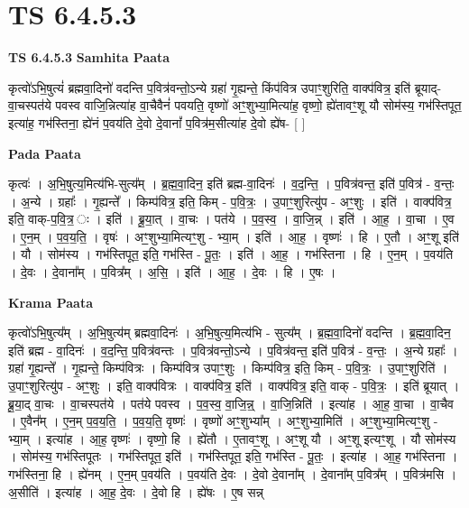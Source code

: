 \documentclass[17pt]{extarticle}
\begin{document}
\section{ TS 6.4.5.3 }

\textbf{TS 6.4.5.3 } \newline
\textbf{Samhita Paata} \newline

कृत्वो॑ऽभि॒षुत्यं॑ ब्रह्मवा॒दिनो॑ वदन्ति प॒वित्र॑वन्तो॒ऽन्ये ग्रहा॑ गृ॒ह्यन्ते॒ किंप॑वित्र उपाꣳ॒॒शुरिति॒ वाक्प॑वित्र॒ इति॑ ब्रूयाद्-वा॒चस्पत॑ये पवस्व वाजि॒न्नित्या॑ह वा॒चैवैनं॑ पवयति॒ वृष्णो॑ अꣳ॒॒शुभ्या॒मित्या॑ह॒ वृष्णो॒ ह्ये॑तावꣳ॒॒शू यौ सोम॑स्य॒ गभ॑स्तिपूत॒ इत्या॑ह॒ गभ॑स्तिना॒ ह्ये॑नं प॒वय॑ति दे॒वो दे॒वानां᳚ प॒वित्र॑म॒सीत्या॑ह दे॒वो ह्ये॑ष- [  ] \newline

\textbf{Pada Paata} \newline

कृत्वः॑ । अ॒भि॒षुत्य॒मित्य॑भि-सुत्य᳚म् । ब्र॒ह्म॒वा॒दिन॒ इति॑ ब्रह्म-वा॒दिनः॑ । व॒द॒न्ति॒ । प॒वित्र॑वन्त॒ इति॑ प॒वित्र॑ - व॒न्तः॒ । अ॒न्ये । ग्रहाः᳚ । गृ॒ह्यन्ते᳚ । किम्प॑वित्र॒ इति॒ किम् - प॒वि॒त्रः॒ । उ॒पाꣳ॒॒शुरित्यु॑प - अꣳ॒॒शुः । इति॑ । वाक्प॑वित्र॒ इति॒ वाक्-प॒वि॒त्र॒ ः । इति॑ । ब्रू॒या॒त् । वा॒चः । पत॑ये । प॒व॒स्व॒ । वा॒जि॒न्न् । इति॑ । आ॒ह॒ । वा॒चा । ए॒व । ए॒न॒म् । प॒व॒य॒ति॒ । वृषः॑ । अꣳ॒॒शुभ्या॒मित्यꣳ॒॒शु - भ्या॒म् । इति॑ । आ॒ह॒ । वृष्णः॑ । हि । ए॒तौ । अꣳ॒॒शू इति॑ । यौ । सोम॑स्य । गभ॑स्तिपूत॒ इति॒ गभ॑स्ति - पू॒तः॒ । इति॑ । आ॒ह॒ । गभ॑स्तिना । हि । ए॒न॒म् । प॒वय॑ति । दे॒वः । दे॒वाना᳚म् । प॒वित्र᳚म् । अ॒सि॒ । इति॑ । आ॒ह॒ । दे॒वः । हि । ए॒षः ।  \newline


\textbf{Krama Paata} \newline

कृत्वो॑ऽभि॒षुत्य᳚म् । अ॒भि॒षुत्य॑म् ब्रह्मवा॒दिनः॑ । अ॒भि॒षुत्य॒मित्य॑भि - सुत्य᳚म् । ब्र॒ह्म॒वा॒दिनो॑ वदन्ति । ब्र॒ह्म॒वा॒दिन॒ इति॑ ब्रह्म - वा॒दिनः॑ । व॒द॒न्ति॒ प॒वित्र॑वन्तः । प॒वित्र॑वन्तो॒ऽन्ये । प॒वित्र॑वन्त॒ इति॑ प॒वित्र॑ - व॒न्तः॒ । अ॒न्ये ग्रहाः᳚ । ग्रहा॑ गृ॒ह्यन्ते᳚ । गृ॒ह्यन्ते॒ किम्प॑वित्रः । किम्प॑वित्र उपाꣳ॒॒शुः । किम्प॑वित्र॒ इति॒ किम् - प॒वि॒त्रः॒ । उ॒पाꣳ॒॒शुरिति॑ । उ॒पाꣳ॒॒शुरित्यु॑प - अꣳ॒॒शुः । इति॒ वाक्प॑वित्रः । वाक्प॑वित्र॒ इति॑ । वाक्प॑वित्र॒ इति॒ वाक् - प॒वि॒त्रः॒ । इति॑ ब्रूयात् । ब्रू॒या॒द् वा॒चः । वा॒चस्पत॑ये । पत॑ये पवस्व । प॒व॒स्व॒ वा॒जि॒न्न्॒ । वा॒जि॒न्निति॑ । इत्या॑ह । आ॒ह॒ वा॒चा । वा॒चैव । ए॒वैन᳚म् । ए॒न॒म् प॒व॒य॒ति॒ । प॒व॒य॒ति॒ वृष्णः॑ । वृष्णो॑ अꣳ॒॒शुभ्या᳚म् । अꣳ॒॒शुभ्या॒मिति॑ । अꣳ॒॒शुभ्या॒मित्यꣳ॒॒शु - भ्या॒म् । इत्या॑ह । आ॒ह॒ वृष्णः॑ । वृष्णो॒ हि । ह्ये॑तौ । ए॒तावꣳ॒॒शू । अꣳ॒॒शू यौ । अꣳ॒॒शू इत्यꣳ॒॒शू । यौ सोम॑स्य । सोम॑स्य॒ गभ॑स्तिपूतः । गभ॑स्तिपूत॒ इति॑ । गभ॑स्तिपूत॒ इति॒ गभ॑स्ति - पू॒तः॒ । इत्या॑ह । आ॒ह॒ गभ॑स्तिना । गभ॑स्तिना॒ हि । ह्ये॑नम् । ए॒न॒म् प॒वय॑ति । प॒वय॑ति दे॒वः । दे॒वो दे॒वाना᳚म् । दे॒वाना᳚म् प॒वित्र᳚म् । प॒वित्र॑मसि । अ॒सीति॑ । इत्या॑ह । आ॒ह॒ दे॒वः । दे॒वो हि । ह्ये॑षः । ए॒ष सन्न् \newline
\end{document}
